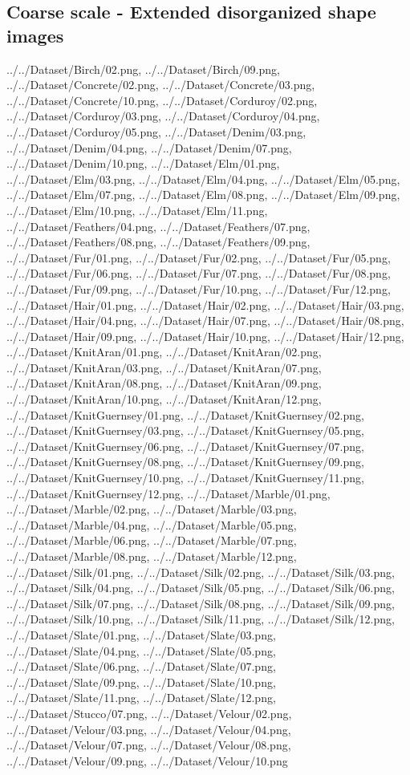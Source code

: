 \newpage
\subsection{Coarse scale - Extended disorganized shape images}
{../../Dataset/Birch/02.png,
../../Dataset/Birch/09.png,
../../Dataset/Concrete/02.png,
../../Dataset/Concrete/03.png,
../../Dataset/Concrete/10.png,
../../Dataset/Corduroy/02.png,
../../Dataset/Corduroy/03.png,
../../Dataset/Corduroy/04.png,
../../Dataset/Corduroy/05.png,
../../Dataset/Denim/03.png,
../../Dataset/Denim/04.png,
../../Dataset/Denim/07.png,
../../Dataset/Denim/10.png,
../../Dataset/Elm/01.png,
../../Dataset/Elm/03.png,
../../Dataset/Elm/04.png,
../../Dataset/Elm/05.png,
../../Dataset/Elm/07.png,
../../Dataset/Elm/08.png,
../../Dataset/Elm/09.png,
../../Dataset/Elm/10.png,
../../Dataset/Elm/11.png,
../../Dataset/Feathers/04.png,
../../Dataset/Feathers/07.png,
../../Dataset/Feathers/08.png,
../../Dataset/Feathers/09.png,
../../Dataset/Fur/01.png,
../../Dataset/Fur/02.png,
../../Dataset/Fur/05.png,
../../Dataset/Fur/06.png,
../../Dataset/Fur/07.png,
../../Dataset/Fur/08.png,
../../Dataset/Fur/09.png,
../../Dataset/Fur/10.png,
../../Dataset/Fur/12.png,
../../Dataset/Hair/01.png,
../../Dataset/Hair/02.png,
../../Dataset/Hair/03.png,
../../Dataset/Hair/04.png,
../../Dataset/Hair/07.png,
../../Dataset/Hair/08.png,
../../Dataset/Hair/09.png,
../../Dataset/Hair/10.png,
../../Dataset/Hair/12.png,
../../Dataset/KnitAran/01.png,
../../Dataset/KnitAran/02.png,
../../Dataset/KnitAran/03.png,
../../Dataset/KnitAran/07.png,
../../Dataset/KnitAran/08.png,
../../Dataset/KnitAran/09.png,
../../Dataset/KnitAran/10.png,
../../Dataset/KnitAran/12.png,
../../Dataset/KnitGuernsey/01.png,
../../Dataset/KnitGuernsey/02.png,
../../Dataset/KnitGuernsey/03.png,
../../Dataset/KnitGuernsey/05.png,
../../Dataset/KnitGuernsey/06.png,
../../Dataset/KnitGuernsey/07.png,
../../Dataset/KnitGuernsey/08.png,
../../Dataset/KnitGuernsey/09.png,
../../Dataset/KnitGuernsey/10.png,
../../Dataset/KnitGuernsey/11.png,
../../Dataset/KnitGuernsey/12.png,
../../Dataset/Marble/01.png,
../../Dataset/Marble/02.png,
../../Dataset/Marble/03.png,
../../Dataset/Marble/04.png,
../../Dataset/Marble/05.png,
../../Dataset/Marble/06.png,
../../Dataset/Marble/07.png,
../../Dataset/Marble/08.png,
../../Dataset/Marble/12.png,
../../Dataset/Silk/01.png,
../../Dataset/Silk/02.png,
../../Dataset/Silk/03.png,
../../Dataset/Silk/04.png,
../../Dataset/Silk/05.png,
../../Dataset/Silk/06.png,
../../Dataset/Silk/07.png,
../../Dataset/Silk/08.png,
../../Dataset/Silk/09.png,
../../Dataset/Silk/10.png,
../../Dataset/Silk/11.png,
../../Dataset/Silk/12.png,
../../Dataset/Slate/01.png,
../../Dataset/Slate/03.png,
../../Dataset/Slate/04.png,
../../Dataset/Slate/05.png,
../../Dataset/Slate/06.png,
../../Dataset/Slate/07.png,
../../Dataset/Slate/09.png,
../../Dataset/Slate/10.png,
../../Dataset/Slate/11.png,
../../Dataset/Slate/12.png,
../../Dataset/Stucco/07.png,
../../Dataset/Velour/02.png,
../../Dataset/Velour/03.png,
../../Dataset/Velour/04.png,
../../Dataset/Velour/07.png,
../../Dataset/Velour/08.png,
../../Dataset/Velour/09.png,
../../Dataset/Velour/10.png}

